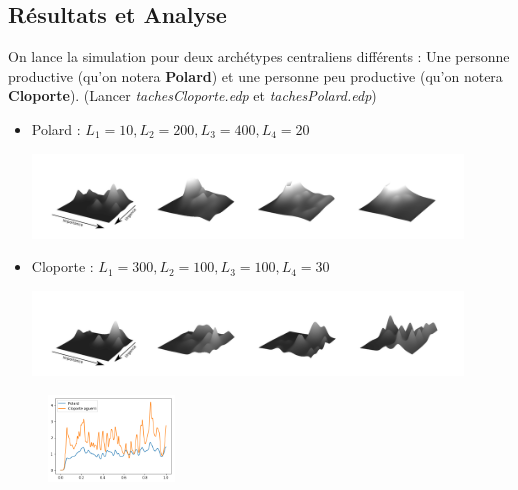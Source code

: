\documentclass[french]{article}
\begin{document}
    \subsection{Résultats et Analyse}
    On lance la simulation  pour deux archétypes centraliens différents : Une personne productive (qu'on notera \textbf{Polard}) et une personne peu productive (qu'on notera \textbf{Cloporte}). (Lancer \textit{tachesCloporte.edp} et \textit{tachesPolard.edp})
    \begin{itemize}
        \item{Polard : $L_1 = 10, L_2 = 200, L_3 = 400, L_4 = 20$}
        \begin{center}
            \includegraphics[width = 0.9\textwidth]{Figures/Evolution/HighProductivity/Stitched.png}
        \end{center}
        \item{Cloporte : $L_1 = 300, L_2 = 100, L_3 = 100, L_4 = 30$} 
        \begin{center}
            \includegraphics[width = 0.9\textwidth]{Figures/Evolution/LowProductivity/Stitched.png}
        \end{center}
    \end{itemize}

    \begin{figure}
        \begin{center}
            \includegraphics[width=0.30\textwidth]{Figures/TravailImpNonFaitDrole.png}
        \end{center}
        \vspace{-60pt}
    \end{figure}
\end{document}
